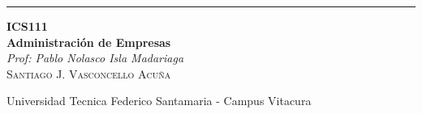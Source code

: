 
\begin{titlepage} %

	\raggedleft %

	\rule{1pt}{\textheight} %
	\hspace{0.05\textwidth} %
	\parbox[b]{0.75\textwidth}{ %

	{\Huge\bfseries ICS111 \\[0.5\baselineskip] Administración de Empresas}\\[2\baselineskip] %
	{\large\textit{Prof: Pablo Nolasco Isla Madariaga}}\\[4\baselineskip] %
	{\Large\textsc{Santiago J. Vasconcello Acuña}} %

	\vspace{0.5\textheight} %

	{\noindent Universidad Tecnica Federico Santamaria - Campus Vitacura}\\[\baselineskip] %
	}

\end{titlepage}

